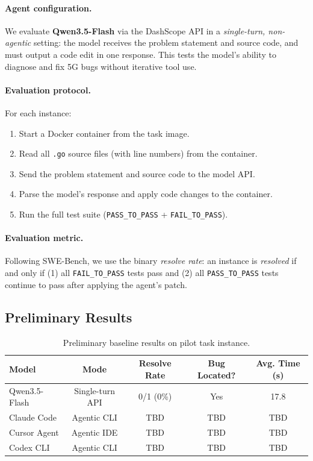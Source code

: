 \documentclass{article}
\begin{document}
\paragraph{Agent configuration.} We evaluate \textbf{Qwen3.5-Flash} \citep{qwen2025} via the DashScope API in a \emph{single-turn, non-agentic} setting: the model receives the problem statement and source code, and must output a code edit in one response. This tests the model's ability to diagnose and fix 5G bugs without iterative tool use.

\paragraph{Evaluation protocol.} For each instance:
\begin{enumerate}
    \item Start a Docker container from the task image.
    \item Read all \texttt{.go} source files (with line numbers) from the container.
    \item Send the problem statement and source code to the model API.
    \item Parse the model's response and apply code changes to the container.
    \item Run the full test suite (\texttt{PASS\_TO\_PASS} + \texttt{FAIL\_TO\_PASS}).
\end{enumerate}

\paragraph{Evaluation metric.} Following SWE-Bench, we use the binary \emph{resolve rate}: an instance is \emph{resolved} if and only if (1) all \texttt{FAIL\_TO\_PASS} tests pass and (2) all \texttt{PASS\_TO\_PASS} tests continue to pass after applying the agent's patch.

\subsection{Preliminary Results}

\begin{table}[h]
\centering
\caption{Preliminary baseline results on pilot task instance.}
\label{tab:results}
\begin{tabular}{lcccc}
\toprule
\textbf{Model} & \textbf{Mode} & \textbf{Resolve Rate} & \textbf{Bug Located?} & \textbf{Avg. Time (s)} \\
\midrule
Qwen3.5-Flash  & Single-turn API  & 0/1 (0\%) & Yes & 17.8 \\
\midrule
Claude Code    & Agentic CLI      & TBD & TBD & TBD \\
Cursor Agent   & Agentic IDE      & TBD & TBD & TBD \\
Codex CLI      & Agentic CLI      & TBD & TBD & TBD \\
\bottomrule
\end{tabular}
\end{table}
\end{document}
